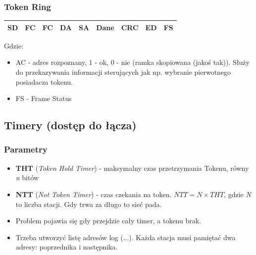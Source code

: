 \documentclass[a4paper,twoside]{article}
\begin{document}
			\subsubsection{Token Ring}
				\begin{table}[h]
					\begin{tabular}{|c|c|c|c|c|c|c|c|c|}
						\hline
						SD & FC & FC & DA & SA & Dane & CRC & ED & FS \\ \hline
					\end{tabular}
				\end{table}
				Gdzie:
				\begin{itemize}
					\item AC - adres rozpoznany, 1 - ok, 0 - nie (ramka skopiowana (jakoś tak)). Służy do przekazywania informacji sterujących jak np. wybranie pierwotnego posiadacza tokenu.
					\item FS - Frame Status
				\end{itemize}
		\subsection{Timery (dostęp do łącza)}
			\subsubsection{Parametry}
				\begin{itemize}
					\item \textbf{THT} (\emph{Token Hold Timer}) - maksymalny czas przetrzymania Tokenu, równy \emph{n} bitów
					\item \textbf{NTT} (\emph{Not Token Timer}) - czas czekania na token. $ NTT=N\times THT $, gdzie \emph{N} to liczba stacji. Gdy trwa za długo to sieć pada.
					\item Problem pojawia się gdy przejdzie cały timer, a tokenu brak.
					\item Trzeba utworzyć listę adresów log (...). Każda stacja musi pamiętać dwa adresy: poprzednika i następnika.
				\end{itemize}
\end{document}
